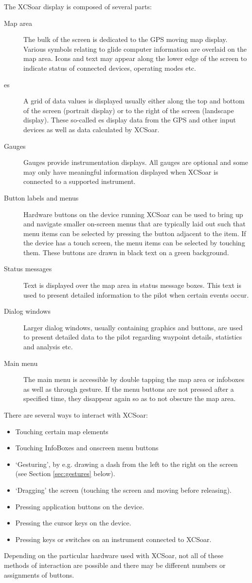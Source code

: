 The XCSoar display is composed of several parts:
\begin{description}
\item[Map area] The bulk of the screen is dedicated to the GPS moving map
display. Various symbols relating to glide computer information are overlaid 
on the map area. Icons and text may appear along the lower edge of the screen
to indicate status of connected devices, operating modes etc.
\item[{\InfoBox}es] A grid of data values is displayed usually either along
the top and bottom of the screen (portrait display) or to the right of the
screen (landscape display).  These so-called {\InfoBox}es display data from the
GPS and other input devices as well as data calculated by XCSoar.
\item[Gauges]  Gauges provide instrumentation displays. All gauges are optional
and some may only have meaningful information displayed when XCSoar is
connected to a supported instrument.
\item[Button labels and menus] Hardware buttons on the device running XCSoar
can be used to bring up and navigate smaller on-screen menus that are
typically laid out such that menu items can be selected by pressing the
button adjacent to the item.  If the device has a touch screen, the menu
items can be selected by touching them.  These buttons are drawn in black
text on a green background.
\item[Status messages] Text is displayed over the map area in status message
boxes.  This text is used to present detailed information to the pilot when
certain events occur.
\item[Dialog windows] Larger dialog windows, usually containing graphics and
buttons, are used to present detailed data to the pilot regarding waypoint
details, statistics and analysis etc.
\item[Main menu] The main menu is accessible by double tapping the map area or
infoboxes as well as through gesture. If the menu buttons are
not pressed after a specified time, they disappear again so as to not obscure the map area.
\end{description}

There are several ways to interact with XCSoar:
\begin{itemize}
\item Touching certain map elements
\item Touching InfoBoxes and onscreen menu buttons
\item `Gesturing', by e.g. drawing a dash from the left to the right
  on the screen (see Section \ref{sec:gestures} below).
\item `Dragging' the screen (touching the screen and moving before releasing).
\item Pressing application buttons on the device.
\item Pressing the cursor keys on the device.
\item Pressing keys or switches on an instrument connected to XCSoar.
\end{itemize}
Depending on the particular hardware used with XCSoar, not all of these methods
of interaction are possible and there may be different numbers or assignments
of buttons.

